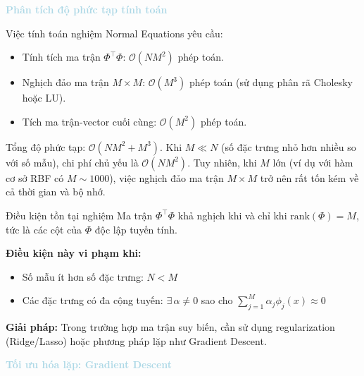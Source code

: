 \vspace{0.5em}
\noindent\textcolor{lightblue}{\textbf{Phân tích độ phức tạp tính toán}}
\vspace{0.5em}

Việc tính toán nghiệm Normal Equations yêu cầu:
\begin{itemize} [labelsep=10pt, leftmargin=2cm]
    \item Tính tích ma trận $\Phi^{\top}\Phi$: $\mathcal{O}(NM^2)$ phép toán.
    \item Nghịch đảo ma trận $M \times M$: $\mathcal{O}(M^3)$ phép toán (sử dụng phân rã Cholesky hoặc LU).
    \item Tích ma trận-vector cuối cùng: $\mathcal{O}(M^2)$ phép toán.
\end{itemize}

Tổng độ phức tạp: $\mathcal{O}(NM^2 + M^3)$. Khi $M \ll N$ (số đặc trưng nhỏ hơn nhiều so với số mẫu), chi phí chủ yếu là $\mathcal{O}(NM^2)$. Tuy nhiên, khi $M$ lớn (ví dụ với hàm cơ sở RBF có $M \sim 1000$), việc nghịch đảo ma trận $M \times M$ trở nên rất tốn kém về cả thời gian và bộ nhớ.

\begin{warningbox}{Điều kiện tồn tại nghiệm}
Ma trận $\Phi^{\top}\Phi$ khả nghịch khi và chỉ khi $\text{rank}(\Phi) = M$, tức là các cột của $\Phi$ độc lập tuyến tính. 

\textbf{Điều kiện này vi phạm khi:}
\begin{itemize}
    \item Số mẫu ít hơn số đặc trưng: $N < M$
    \item Các đặc trưng có đa cộng tuyến: $\exists \, \alpha \neq 0$ sao cho $\sum_{j=1}^{M} \alpha_j \phi_j(x) \approx 0$
\end{itemize}

\textbf{Giải pháp:} Trong trường hợp ma trận suy biến, cần sử dụng regularization (Ridge/Lasso) hoặc phương pháp lặp như Gradient Descent.
\end{warningbox}

\vspace{0.5em}
\noindent\textcolor{lightblue}{\textbf{Tối ưu hóa lặp: Gradient Descent}}
\vspace{0.5em}

